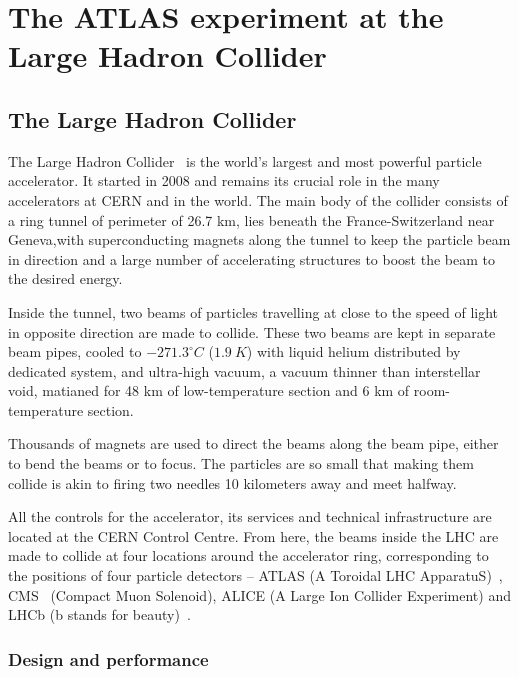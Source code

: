 \section{The ATLAS experiment at the Large Hadron Collider}
\subsection{The Large Hadron Collider}

The Large Hadron Collider~\cite{Evans:2008zzb} is the world's 
largest and most powerful particle accelerator. 
It started in 2008 and remains its crucial role in the many 
accelerators at CERN and in the world.
The main body of the collider consists of a ring tunnel of 
perimeter of 26.7 km, lies beneath the France-Switzerland near
Geneva,with superconducting magnets along the tunnel to keep the 
particle beam in direction
 and a large number of accelerating structures to boost the 
 beam to the desired energy.

Inside the tunnel, two beams of particles travelling at close 
to the speed of light 
in opposite direction are made to collide. 
These two beams are kept in separate beam pipes,
cooled to $-271.3^\circ C$ ($1.9\ K$) with liquid 
helium distributed by dedicated system, 
 and ultra-high vacuum, a vacuum thinner than 
interstellar void, matianed for 48 km of low-temperature 
section and 6 km of room-temperature 
section. 

Thousands of magnets are used to direct the beams 
along the beam pipe, either to bend the beams or
to focus. The particles are so small that making them collide is akin to 
firing two needles 10 kilometers away and meet halfway. 

All the controls for the accelerator, its services and technical infrastructure 
are located at the CERN Control Centre. 
From here, the beams inside the LHC are made to collide 
at four locations around the accelerator ring, 
corresponding to the positions of four particle 
detectors – ATLAS (A Toroidal LHC ApparatuS)~\cite{PERF-2007-01}, 
CMS~\cite{CMS-2008xjf} (Compact Muon Solenoid), ALICE (A Large Ion Collider Experiment) 
\cite{ALICE-2008ngc} and LHCb (b stands for beauty)~\cite{LHCb-2008vvz}.


	\subsubsection{Design and performance}

